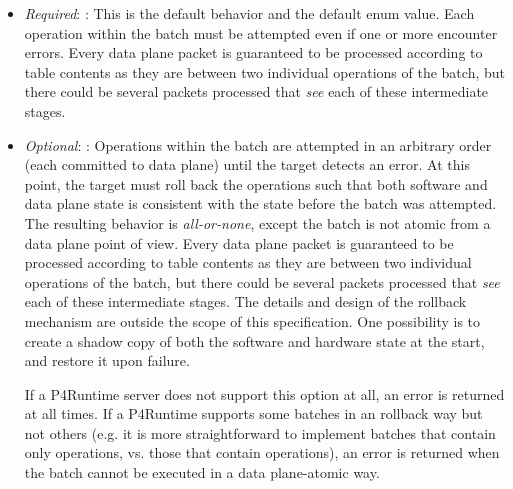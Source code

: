 \documentclass[11pt]{article}
\begin{document}
{%
\begin{itemize}%

\item{}
\emph{Required}: : This is the default behavior and the default
enum value. Each operation within the batch must be attempted even if one or
more encounter errors. Every data plane packet is guaranteed to be processed
according to table contents as they are between two individual operations of
the batch, but there could be several packets processed that \emph{see} each of
these intermediate stages.%

\item{}
\emph{Optional}: : Operations within the batch are attempted in
an arbitrary order (each committed to data plane) until the target detects an
error. At this point, the target must roll back the operations such that both
software and data plane state is consistent with the state before the batch
was attempted. The resulting behavior is \emph{all-or-none}, except the batch is
not atomic from a data plane point of view. Every data plane packet is
guaranteed to be processed according to table contents as they are between two
individual operations of the batch, but there could be several packets
processed that \emph{see} each of these intermediate stages. The details and design
of the rollback mechanism are outside the scope of this specification. One
possibility is to create a shadow copy of both the software and hardware state
at the start, and restore it upon failure.%

If a P4Runtime server does not support this option at all, an
 error is returned at all times. If a P4Runtime
supports some batches in an rollback way but not others (e.g. it is
more straightforward to implement batches that contain only 
operations, vs. those that contain  operations), an
 error is returned when the batch cannot be executed
in a data plane-atomic way.%


\end{itemize}}
\end{document}

